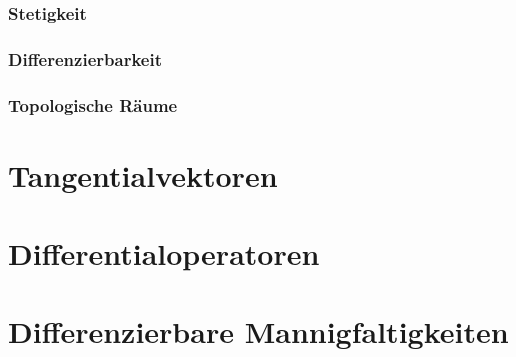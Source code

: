 \subsubsection{Stetigkeit}

\subsubsection{Differenzierbarkeit}

\subsubsection{Topologische Räume}

%
%
\section{Tangentialvektoren
\label{buch:koordinaten:section:tangentialvektoren}}

%
%
\section{Differentialoperatoren
\label{buch:koordinaten:section:differentialoperatoren}}

%
%
\section{Differenzierbare Mannigfaltigkeiten
\label{buch:koordinatne:section:mannigfaltigkeiten}}




